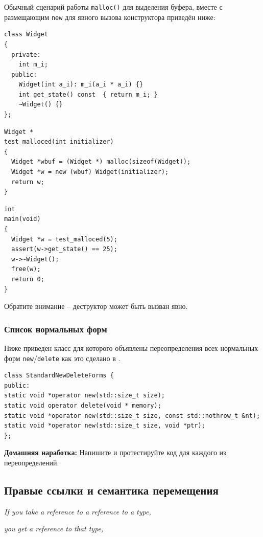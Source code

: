 \documentclass[a4paper,12pt,oneside]{article}
\begin{document}
Обычный сценарий работы \lstinline!malloc()! для выделения буфера, вместе с размещающим \lstinline!new! для явного вызова конструктора приведён ниже:

\begin{lstlisting}
class Widget
{
  private:
    int m_i;
  public:
    Widget(int a_i): m_i(a_i * a_i) {}
    int get_state() const  { return m_i; }
    ~Widget() {}
};
\end{lstlisting}

\begin{lstlisting}
Widget *
test_malloced(int initializer)
{
  Widget *wbuf = (Widget *) malloc(sizeof(Widget));
  Widget *w = new (wbuf) Widget(initializer);
  return w;
}
\end{lstlisting}

\begin{lstlisting}
int 
main(void)
{
  Widget *w = test_malloced(5);
  assert(w->get_state() == 25);
  w->~Widget();
  free(w);
  return 0;
}
\end{lstlisting}

Обратите внимание -- деструктор может быть вызван явно.

\subsubsection{Список нормальных форм}\label{subsub:normalforms}

Ниже приведен класс для которого объявлены переопределения всех нормальных форм \lstinline!new!/\lstinline!delete! как это сделано в \cite{effcpp3d}.

\begin{lstlisting}
class StandardNewDeleteForms {
public:
static void *operator new(std::size_t size);
static void operator delete(void * memory);
static void *operator new(std::size_t size, const std::nothrow_t &nt);
static void *operator new(std::size_t size, void *ptr);
};
\end{lstlisting}

\textbf{Домашняя наработка:} Напишите и протестируйте код для каждого из переопределений.

\pagebreak
\subsection{Правые ссылки и семантика перемещения}

\hfill\textit{If you take a reference to a reference to a type,}

\hfill\textit{you get a reference to that type,}
\end{document}
